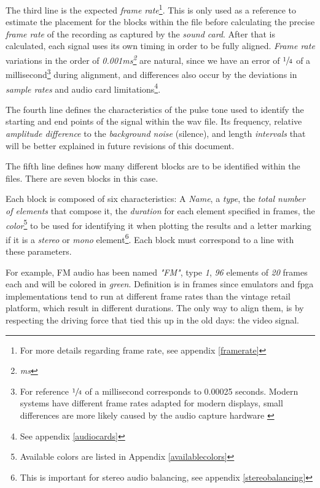 \documentclass[10pt,a4paper]{report}
\newcommand{\define}[1]{\textit{\acrshort{#1}\footnote{\textit{\acrlong{#1}}}}}
\begin{document}
\begin{appendices}
The third line is the expected \textit{frame rate}\footnote{For more details regarding frame rate, see appendix \ref{framerate}}. This is only used as a reference to estimate the placement for the blocks within the file before calculating the precise \textit{frame rate} of the recording as captured by the \textit{sound card}. After that is calculated, each signal uses its own timing in order to be fully aligned. \textit{Frame rate} variations in the order of \textit{0.001\define{ms}} are natural, since we have an error of $\sfrac{1}{4}$ of a millisecond\footnote{For reference $\sfrac{1}{4}$ of a millisecond corresponds to 0.00025 seconds. Modern systems have different frame rates adapted for modern displays, small differences are more likely caused by the audio capture hardware \cite{SoundCardClock}} during alignment, and differences also occur by the deviations in \textit{sample rates} and audio card limitations\footnote{See appendix \ref{audiocards}}.

The fourth line defines the characteristics of the pulse tone used to identify the starting and end points of the signal within the \acrshort{wav} file. Its frequency, relative \textit{amplitude difference} to the \textit{background noise} (silence), and length \textit{intervals} that will be better explained in future revisions of this document.

The fifth line defines how many different blocks are to be identified within the files. There are seven blocks in this case.

Each block is composed of six characteristics: A \textit{Name}, a \textit{type}, the \textit{total number of elements} that compose it, the \textit{duration} for each element specified in frames, the \textit{color}\footnote{Available colors are listed in Appendix \ref{availablecolors}} to be used for identifying it when plotting the results and a letter marking if it is a \textit{stereo} or \textit{mono} element\footnote{This is important for stereo audio balancing, see appendix \ref{stereobalancing}}. Each block must correspond to a line with these parameters.

For example, FM audio has been named \textit{"FM"}, type \textit{1}, \textit{96} elements of \textit{20} frames each and will be colored in \textit{green}. Definition is in frames since emulators and \acrshort{fpga} implementations tend to run at different frame rates than the vintage retail platform, which result in different durations. The only way to align them, is by respecting the driving force that tied this up in the old days: the video signal.


\end{appendices}
\end{document}
